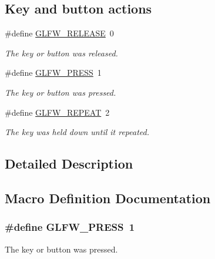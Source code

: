 \subsection*{Key and button actions}
\begin{DoxyCompactItemize}
\item 
\#define \hyperlink{group__input_gada11d965c4da13090ad336e030e4d11f}{G\-L\-F\-W\-\_\-\-R\-E\-L\-E\-A\-S\-E}~0
\begin{DoxyCompactList}\small\item\em The key or button was released. \end{DoxyCompactList}\item 
\#define \hyperlink{group__input_ga2485743d0b59df3791c45951c4195265}{G\-L\-F\-W\-\_\-\-P\-R\-E\-S\-S}~1
\begin{DoxyCompactList}\small\item\em The key or button was pressed. \end{DoxyCompactList}\item 
\#define \hyperlink{group__input_gac96fd3b9fc66c6f0eebaf6532595338f}{G\-L\-F\-W\-\_\-\-R\-E\-P\-E\-A\-T}~2
\begin{DoxyCompactList}\small\item\em The key was held down until it repeated. \end{DoxyCompactList}\end{DoxyCompactItemize}


\subsection{Detailed Description}


\subsection{Macro Definition Documentation}
\hypertarget{group__input_ga2485743d0b59df3791c45951c4195265}{
\subsubsection[{G\-L\-F\-W\-\_\-\-P\-R\-E\-S\-S}]{\setlength{\rightskip}{0pt plus 5cm}\#define G\-L\-F\-W\-\_\-\-P\-R\-E\-S\-S~1}}\label{group__input_ga2485743d0b59df3791c45951c4195265}


The key or button was pressed. 




